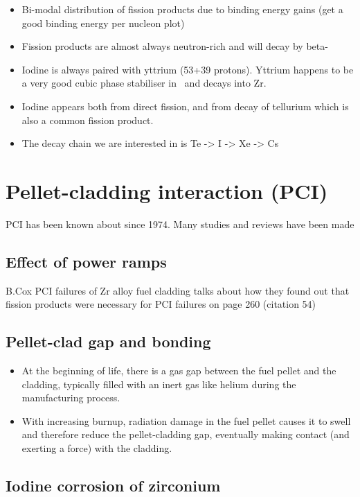 \begin{itemize}
\item Bi-modal distribution of fission products due to binding energy gains (get a good binding energy per nucleon plot)
\item Fission products are almost always neutron-rich and will decay by beta-
\item Iodine is always paired with yttrium (53+39 protons). Yttrium happens to be a very good cubic phase stabiliser in \zirconia\ and decays into Zr.
\item Iodine appears both from direct fission, and from decay of tellurium which is also a common fission product.
\item The decay chain we are interested in is Te -> I -> Xe -> Cs
\end{itemize}

\section{Pellet-cladding interaction (PCI)}

PCI has been known about since 1974. Many studies and reviews have been made \cite{alam2011review}

\subsection{Effect of power ramps}
B.Cox PCI failures of Zr alloy fuel cladding \cite{bcoxpelletclad1990} talks about how they found out that fission products were necessary for PCI failures on page 260 (citation 54)

\subsection{Pellet-clad gap and bonding}

\begin{itemize}
\item At the beginning of life, there is a gas gap between the fuel pellet and the cladding, typically filled with an inert gas like helium during the manufacturing process.
\item With increasing burnup, radiation damage in the fuel pellet causes it to swell and therefore reduce the pellet-cladding gap, eventually making contact (and exerting a force) with the cladding.
\end{itemize}

\subsection{Iodine corrosion of zirconium}

